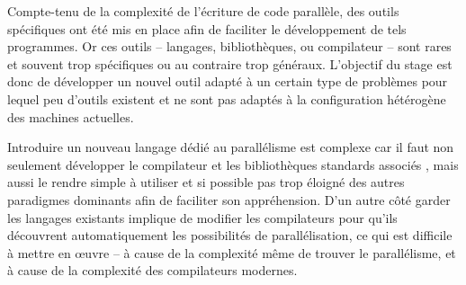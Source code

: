 Compte-tenu de la complexité de l'écriture de code parallèle, des outils spécifiques ont été mis en place afin de faciliter le développement de tels programmes. Or ces outils -- langages, bibliothèques, ou compilateur -- sont rares et souvent trop spécifiques ou au contraire trop généraux. L'objectif du stage est donc de développer un nouvel outil adapté à un certain type de problèmes pour lequel peu d'outils existent et ne sont pas adaptés à la configuration hétérogène des machines actuelles.

Introduire un nouveau langage dédié au parallélisme est complexe car il faut non seulement développer le compilateur et les bibliothèques standards associés , mais aussi le rendre simple à utiliser et si possible pas trop éloigné des autres paradigmes dominants afin de faciliter son appréhension. D'un autre côté garder les langages existants implique de modifier les compilateurs pour qu'ils découvrent automatiquement les possibilités de parallélisation, ce qui est difficile à mettre en œuvre -- à cause de la complexité même de trouver le parallélisme, et à cause de la complexité des compilateurs modernes.

